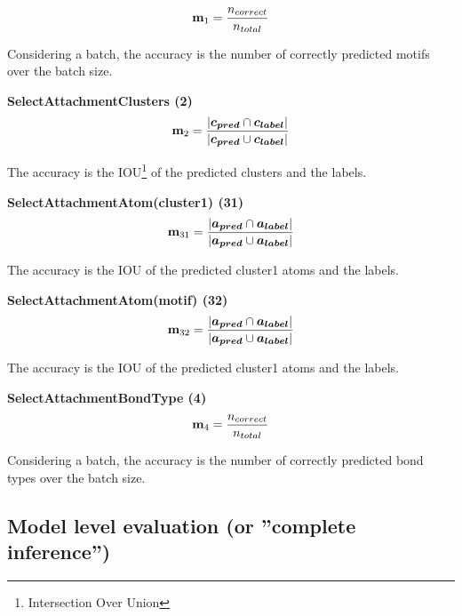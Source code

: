 \documentclass{article}
\begin{document}
\begin{description}

\item[\textbf{SelectMotifMlp (1)}]
\begin{equation}
    \mathbf{m}_1 = \frac{n_{correct}}{n_{total}}
\end{equation}

Considering a batch, the accuracy is the number of correctly predicted motifs over the batch size.

\item{\textbf{SelectAttachmentClusters (2)}}
\begin{equation}
    \mathbf{m}_2 =
    \frac{|\boldsymbol{c_{pred}} \cap \boldsymbol{c_{label}}|}
    {|\boldsymbol{c_{pred}} \cup \boldsymbol{c_{label}}|}
\end{equation}

The accuracy is the IOU\footnote{Intersection Over Union} of the predicted clusters and the labels.

\item{\textbf{SelectAttachmentAtom(cluster1) (31)}}
\begin{equation}
    \mathbf{m}_{31} =
    \frac{|\boldsymbol{a_{pred}} \cap \boldsymbol{a_{label}}|}
    {|\boldsymbol{a_{pred}} \cup \boldsymbol{a_{label}}|}
\end{equation}

The accuracy is the IOU of the predicted cluster1 atoms and the labels.

\item{\textbf{SelectAttachmentAtom(motif) (32)}}
\begin{equation}
    \mathbf{m}_{32} =
    \frac{|\boldsymbol{a_{pred}} \cap \boldsymbol{a_{label}}|}
    {|\boldsymbol{a_{pred}} \cup \boldsymbol{a_{label}}|}
\end{equation}

The accuracy is the IOU of the predicted cluster1 atoms and the labels.

\item{\textbf{SelectAttachmentBondType (4)}}
\begin{equation}
    \mathbf{m}_4 = \frac{n_{correct}}{n_{total}}
\end{equation}

Considering a batch, the accuracy is the number of correctly predicted bond types over the batch size.

\end{description}

\subsection{Model level evaluation (or ''complete inference'')}
\end{document}
